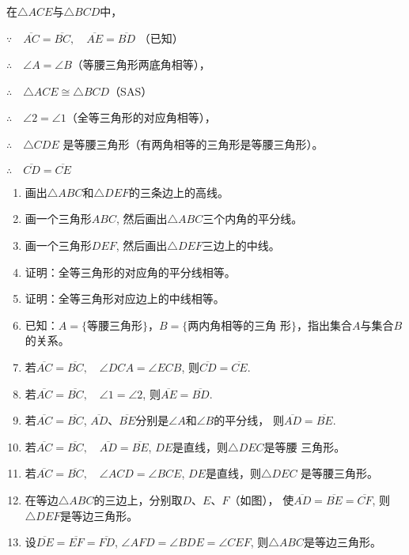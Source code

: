 \begin{solution}
在$\triangle ACE$与$\triangle BCD$中，

$\because\quad \overline{AC}=\overline{BC},\quad \overline{AE}=\overline{BD}$ （已知）

$\therefore\quad \angle A=\angle B$（等腰三角形两底角相等），

$\therefore\quad \triangle ACE\cong \triangle BCD$（SAS）

$\therefore\quad \angle 2=\angle 1$（全等三角形的对应角相等），

$\therefore\quad \triangle CDE$ 是等腰三角形（有两角相等的三角形是等腰三角形）。

$\therefore\quad \overline{CD}=\overline{CE}$
\end{solution}

\begin{ex}
\begin{enumerate}
    \item 画出$\triangle ABC$和$\triangle DEF$的三条边上的高线。
    \item 画一个三角形$ABC$, 然后画出$\triangle ABC$三个内角的平分线。
    \item 画一个三角形$DEF$, 然后画出$\triangle DEF$三边上的中线。
    \item 证明：全等三角形的对应角的平分线相等。
    \item 证明：全等三角形对应边上的中线相等。
    \item 已知：$A=\{\text{等腰三角形}\}$，$B=\{\text{两内角相等的三角
    形}\}$，指出集合$A$与集合$B$的关系。
    \item 若$\overline{AC}=\overline{BC},\quad \angle DCA=\angle ECB$, 则$\overline{CD}=\overline{CE}$.
    \item 若$\overline{AC}=\overline{BC},\quad \angle 1=\angle 2$, 则$\overline{AE}=\overline{BD}$.
    \item 若$\overline{AC}=\overline{BC}$, $\overline{AD}$、$\overline{BE}$分别是$\angle A$和$\angle B$的平分线，
    则$\overline{AD}=\overline{BE}$.
    \item 若$\overline{AC}=\overline{BC},\quad \overline{AD}=\overline{BE}$, $DE$是直线，则$\triangle DEC$是等腰
三角形。
\item 若$\overline{AC}=\overline{BC},\quad \angle ACD=\angle BCE$, $DE$是直线，则$\triangle DEC$
是等腰三角形。
\item 在等边$\triangle ABC$的三边上，分别取$D$、$E$、$F$（如图），
使$\overline{AD}=\overline{BE}=\overline{CF}$, 则$\triangle DEF$是等边三角形。
\item 设$\overline{DE}=\overline{EF}=\overline{FD}$, $\angle AFD=\angle BDE=\angle CEF$, 
则$\triangle ABC$是等边三角形。
\end{enumerate}
\end{ex}

